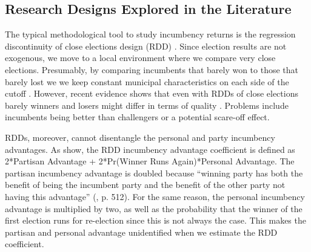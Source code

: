 \subsection{Research Designs Explored in the Literature \label{sec:design_literature}}
The typical methodological tool to study incumbency returns is the regression discontinuity of close elections design (RDD) \citep{thistlethwaite_etal_1960, imbens_lemieux_2008, lee_2008}. Since election results are not exogenous, we move to a local environment where we compare very close elections. Presumably, by comparing incumbents that barely won to those that barely lost we we keep constant municipal characteristics on each side of the cutoff \citep{lee_2008, boas_hidalgo_2011, broockman_2009, butler_2009, dalbo_etal_2009, querubin_snyder_2013, titiunik_2012, klasnja_titiunik_2017}. However, recent evidence shows that even with RDDs of close elections barely winners and losers might differ in terms of quality \citep{eggers_2017, caughey_sekhon_2011, grimmer_etal_2012}. Problems include incumbents being better than challengers or a potential scare-off effect. 
   
RDDs, moreover, cannot disentangle the personal and party incumbency advantages. As \citet{erikson_titiunik_2015} show, the RDD incumbency advantage coefficient is defined as 2*Partisan Advantage + 2*Pr(Winner Runs Again)*Personal Advantage. The partisan incumbency advantage is doubled because ``winning party has both the benefit of being the incumbent party and the benefit of the other party not having this advantage'' (\citet{fowler_hall_2014}, p. 512). For the same reason, the personal incumbency advantage is multiplied by two, as well as the probability that the winner of the first election runs for re-election since this is not always the case. This makes the partisan and personal advantage unidentified when we estimate the RDD coefficient.

